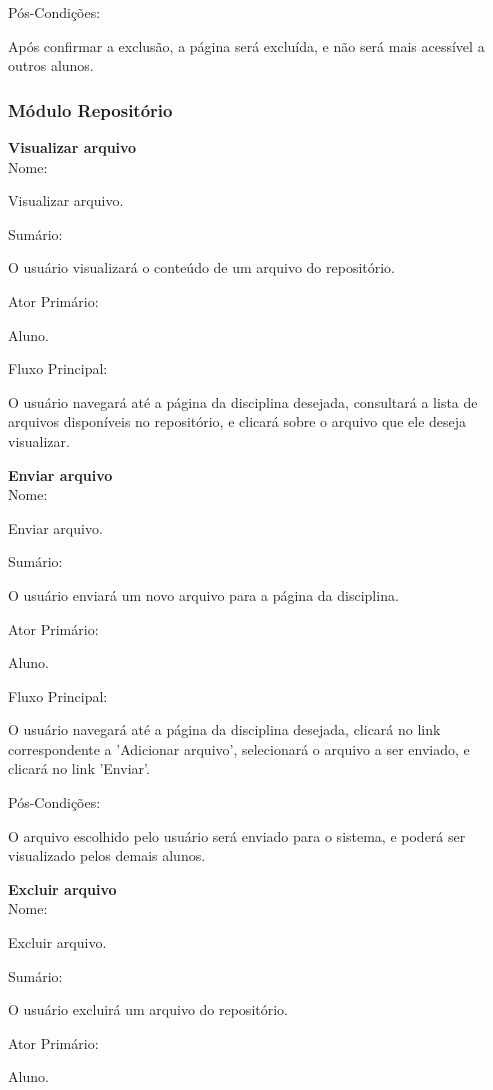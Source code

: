\documentclass[11pt]{article}
\begin{document}
Pós-Condições:

      Após confirmar a exclusão, a página será excluída, e não será mais acessível a outros alunos. 

\subsubsection{Módulo Repositório}
\textbf{Visualizar arquivo}
\\

Nome:

      Visualizar arquivo. 

Sumário:

      O usuário visualizará o conteúdo de um arquivo do repositório. 

Ator Primário:

      Aluno. 

Fluxo Principal:

      O usuário navegará até a página da disciplina desejada, consultará a lista de arquivos disponíveis no repositório, e clicará sobre o arquivo que ele deseja visualizar. 

\textbf{Enviar arquivo}
\\

Nome:

      Enviar arquivo. 

Sumário:

      O usuário enviará um novo arquivo para a página da disciplina. 

Ator Primário:

      Aluno. 

Fluxo Principal:

      O usuário navegará até a página da disciplina desejada, clicará no link correspondente a 'Adicionar arquivo', selecionará o arquivo a ser enviado, e clicará no link 'Enviar'. 

Pós-Condições:

      O arquivo escolhido pelo usuário será enviado para o sistema, e poderá ser visualizado pelos demais alunos. 

\textbf{Excluir arquivo}
\\

Nome:

      Excluir arquivo. 

Sumário:

      O usuário excluirá um arquivo do repositório. 

Ator Primário:

      Aluno. 
\end{document}
